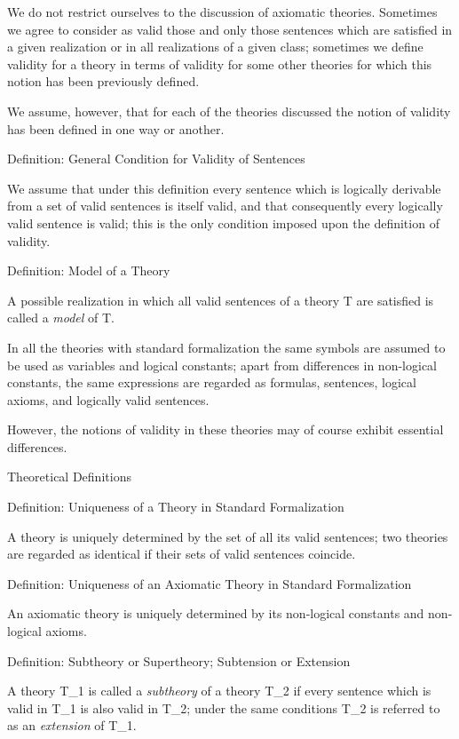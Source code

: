 We do not restrict ourselves to the discussion of axiomatic theories.
Sometimes we agree to consider as valid those and only those sentences
which are satisfied in a given realization or in all realizations of a
given class; sometimes we define validity for a theory in terms of
validity for some other theories for which this notion has been
previously defined.

We assume, however, that for each of the theories discussed the notion
of validity has been defined in one way or another.

\protect\hypertarget{anchor-26}{}{}Definition: General Condition for
Validity of Sentences

We assume that under this definition every sentence which is logically
derivable from a set of valid sentences is itself valid, and that
consequently every logically valid sentence is valid; this is the only
condition imposed upon the definition of validity.

\protect\hypertarget{anchor-27}{}{}Definition: Model of a Theory

A possible realization in which all valid sentences of a theory T are
satisfied is called a \emph{model} of T.

In all the theories with standard formalization the same symbols are
assumed to be used as variables and logical constants; apart from
differences in non-logical constants, the same expressions are regarded
as formulas, sentences, logical axioms, and logically valid sentences.

However, the notions of validity in these theories may of course exhibit
essential differences.

\protect\hypertarget{anchor-28}{}{}Theoretical Definitions

\protect\hypertarget{anchor-29}{}{}Definition: Uniqueness of a Theory in
Standard Formalization

A theory is uniquely determined by the set of all its valid sentences;
two theories are regarded as identical if their sets of valid sentences
coincide.

\protect\hypertarget{anchor-30}{}{}Definition: Uniqueness of an
Axiomatic Theory in Standard Formalization

An axiomatic theory is uniquely determined by its non-logical constants
and non-logical axioms.

\protect\hypertarget{anchor-31}{}{}Definition: Subtheory or Supertheory;
Subtension or Extension

A theory T\_1 is called a \emph{subtheory} of a theory T\_2 if every
sentence which is valid in T\_1 is also valid in T\_2; under the same
conditions T\_2 is referred to as an \emph{extension} of T\_1.

